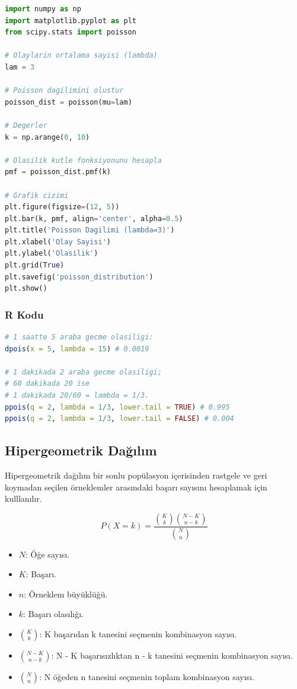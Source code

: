 \begin{lstlisting}[language=Python]
import numpy as np
import matplotlib.pyplot as plt
from scipy.stats import poisson

# Olaylarin ortalama sayisi (lambda)
lam = 3

# Poisson dagilimini olustur
poisson_dist = poisson(mu=lam)

# Degerler
k = np.arange(0, 10)

# Olasilik kutle fonksiyonunu hesapla
pmf = poisson_dist.pmf(k)

# Grafik cizimi
plt.figure(figsize=(12, 5))
plt.bar(k, pmf, align='center', alpha=0.5)
plt.title('Poisson Dagilimi (lambda=3)')
plt.xlabel('Olay Sayisi')
plt.ylabel('Olasilik')
plt.grid(True)
plt.savefig('poisson_distribution')
plt.show()
\end{lstlisting}

\subsubsection{R Kodu}

\begin{lstlisting}[language=R]
# 1 saatte 5 araba gecme olasiligi:
dpois(x = 5, lambda = 15) # 0.0019

# 1 dakikada 2 araba gecme olasiligi;
# 60 dakikada 20 ise
# 1 dakikada 20/60 = lambda = 1/3.
ppois(q = 2, lambda = 1/3, lower.tail = TRUE) # 0.995
ppois(q = 2, lambda = 1/3, lower.tail = FALSE) # 0.004
\end{lstlisting}

\newpage

\subsection{Hipergeometrik  Dağılım}
Hipergeometrik dağılım bir sonlu popülasyon içerisinden rastgele ve geri koymadan seçilen örneklemler arasındaki başarı sayısını hesaplamak için kulllanılır. 

\[
P(X = k) = \frac{\binom{K}{k} \binom{N-K}{n-k}}{\binom{N}{n}}
\]

\begin{itemize}
	\item $N$: Öğe sayısı.
	\item $K$: Başarı.
	\item $n$: Örneklem büyüklüğü.
	\item $k$: Başarı olasılığı.
	\item $\binom{K}{k}$: K başarıdan k tanesini seçmenin kombinasyon sayısı.
	\item $\binom{N-K}{n-k}$: N - K başarısızlıktan n - k tanesini seçmenin kombinasyon sayısı.
	\item $\binom{N}{n}$: N öğeden n tanesini seçmenin toplam kombinasyon sayısı.
\end{itemize}

